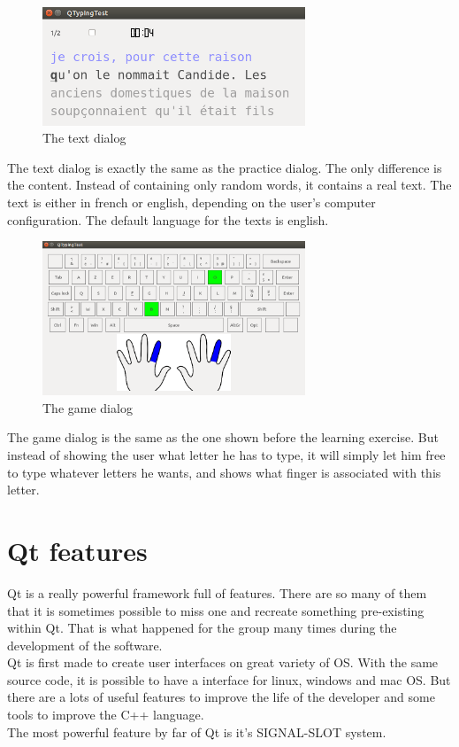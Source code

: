 \begin{figure}[H]
	\centering
	\includegraphics[width=0.7\textwidth]{images/dialog-text.png}
	 \caption{The text dialog}
	 \label{dialog-text}
\end{figure}

The text dialog is exactly the same as the practice dialog. The only difference is the content. Instead of containing only random words, it contains a real text. The text is either in french or english, depending on the user's computer configuration. The default language for the texts is english.

\begin{figure}[H]
	\centering
	\includegraphics[width=0.7\textwidth]{images/dialog-game.png}
	 \caption{The game dialog}
	 \label{dialog-game}
\end{figure}

The game dialog is the same as the one shown before the learning exercise. But instead of showing the user what letter he has to type, it will simply let him free to type whatever letters he wants, and shows what finger is associated with this letter. \\

\section{Qt features}

Qt is a really powerful framework full of features. There are so many of them that it is sometimes possible to miss one and recreate something pre-existing within Qt. That is what happened for the group many times during the development of the software.\\
Qt is first made to create user interfaces on great variety of OS. With the same source code, it is possible to have a interface for linux, windows and mac OS. But there are a lots of useful features to improve the life of the developer and some tools to improve the C++ language.\\
The most powerful feature by far of Qt is it's SIGNAL-SLOT system.

